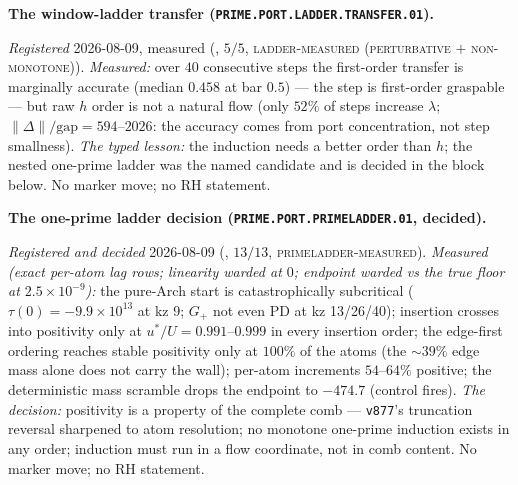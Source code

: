 \par\smallskip\noindent\textbf{The window-ladder transfer
(\texttt{PRIME.PORT.LADDER.\allowbreak TRANSFER.01}).}
{\sloppy
\emph{Registered} 2026-08-09, measured
(, $5/5$,
\textsc{ladder-measured (perturbative $+$ non-monotone)}).
\emph{Measured:} over $40$ consecutive steps the first-order
transfer is marginally accurate (median $0.458$ at bar $0.5$)
--- the step is first-order graspable --- but raw $h$ order is
not a natural flow (only $52\%$ of steps increase $\lambda$;
$\|\Delta\|/\mathrm{gap} = 594$--$2026$: the accuracy comes from
port concentration, not step smallness).  \emph{The typed
lesson:} the induction needs a better order than $h$; the nested
one-prime ladder was the named candidate and is decided in the
block below.  No marker move; no RH statement.\par}


\par\smallskip\noindent\textbf{The one-prime ladder decision
(\texttt{PRIME.PORT.\allowbreak PRIMELADDER.01}, decided).}
{\sloppy
\emph{Registered and decided} 2026-08-09
(, $13/13$,
\textsc{primeladder-measured}).  \emph{Measured (exact per-atom
lag rows; linearity warded at $0$; endpoint warded vs the true
floor at $2.5\times10^{-9}$):} the pure-Arch start is
catastrophically subcritical ($\tau(0) = -9.9\times10^{13}$ at
kz 9; $G_+$ not even PD at kz 13/26/40); insertion crosses into
positivity only at $u^{*}/U = 0.991$--$0.999$ in every insertion
order; the edge-first ordering reaches stable positivity only at
$100\%$ of the atoms (the ${\sim}39\%$ edge mass alone does not
carry the wall); per-atom increments $54$--$64\%$ positive; the
deterministic mass scramble drops the endpoint to $-474.7$
(control fires).  \emph{The decision:} positivity is a property
of the complete comb --- \texttt{v877}'s truncation reversal
sharpened to atom resolution; no monotone one-prime induction
exists in any order; induction must run in a flow coordinate,
not in comb content.  No marker move; no RH statement.\par}


